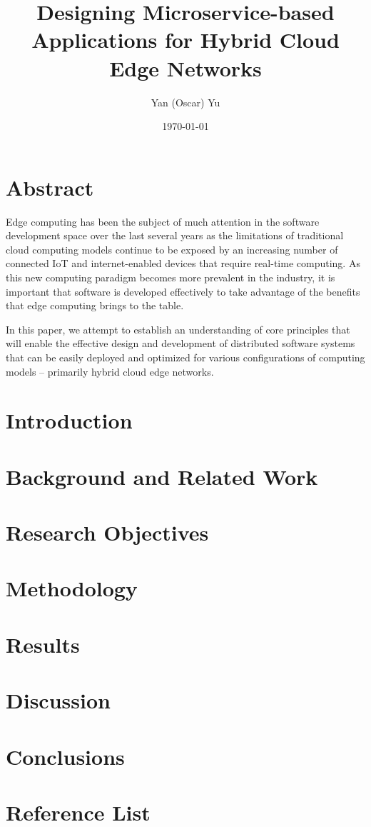 \documentclass[11pt]{article}
\title{Designing Microservice-based Applications for Hybrid Cloud Edge Networks}
\author{Yan (Oscar) Yu}
\date{\today}
\begin{document}


\section*{Abstract}

Edge computing has been the subject of much attention in the software
development space over the last several years as the limitations of traditional cloud computing 
models continue to be exposed by an increasing number of connected IoT and internet-enabled 
devices that require real-time computing. As this new computing paradigm becomes more prevalent 
in the industry, it is important that software is developed effectively to take advantage of the
benefits that edge computing brings to the table.
\newline

In this paper, we attempt to establish an understanding of core principles that will enable the 
effective design and development of distributed software systems that can be easily deployed and 
optimized for various configurations of computing models -- primarily hybrid cloud edge networks.
\newline

\newpage
\tableofcontents

\newpage
\section{Introduction}

\newpage
\section{Background and Related Work}

\newpage
\section{Research Objectives}

\newpage
\section{Methodology}

\newpage
\section{Results}

\newpage
\section{Discussion}

\newpage
\section{Conclusions}

\newpage
\section{Reference List}
\end{document}
